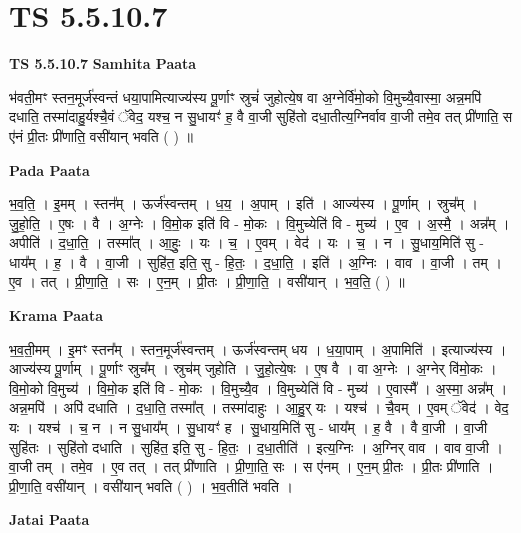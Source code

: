 \documentclass[17pt]{extarticle}
\begin{document}
\section{ TS 5.5.10.7 }

\textbf{TS 5.5.10.7 } \newline
\textbf{Samhita Paata} \newline

भ॑वती॒मꣳ स्तन॒मूर्ज॑स्वन्तं धया॒पामित्याज्य॑स्य पू॒र्णाꣳ स्रुचं॑ जुहोत्ये॒ष वा अ॒ग्नेर्वि॑मो॒को वि॒मुच्यै॒वास्मा॒ अन्न॒मपि॑ दधाति॒ तस्मा॑दाहु॒र्यश्चै॒वं ॅवेद॒ यश्च॒ न सु॒धायꣳ॑ ह॒ वै वा॒जी सुहि॑तो दधा॒तीत्य॒ग्निर्वाव वा॒जी तमे॒व तत् प्री॑णाति॒ स ए॑नं प्री॒तः प्री॑णाति॒ वसी॑यान् भवति ( ) ॥ \newline

\textbf{Pada Paata} \newline

भ॒व॒ति॒ । इ॒मम् । स्तन᳚म् । ऊर्ज॑स्वन्तम् । ध॒य॒ । अ॒पाम् । इति॑ । आज्य॑स्य । पू॒र्णाम् । स्रुच᳚म् । जु॒हो॒ति॒ । ए॒षः । वै । अ॒ग्नेः । वि॒मो॒क इति॑ वि - मो॒कः । वि॒मुच्येति॑ वि - मुच्य॑ । ए॒व । अ॒स्मै॒ । अन्न᳚म् । अपीति॑ । द॒धा॒ति॒ । तस्मा᳚त् । आ॒हुः॒ । यः । च॒ । ए॒वम् । वेद॑ । यः । च॒ । न । सु॒धाय॒मिति॑ सु - धाय᳚म् । ह॒ । वै । वा॒जी । सुहि॑त॒ इति॒ सु - हि॒तः॒ । द॒धा॒ति॒ । इति॑ । अ॒ग्निः । वाव । वा॒जी । तम् । ए॒व । तत् । प्री॒णा॒ति॒ । सः । ए॒न॒म् । प्री॒तः । प्री॒णा॒ति॒ । वसी॑यान् । भ॒व॒ति॒ ( ) ॥  \newline


\textbf{Krama Paata} \newline

भ॒व॒ती॒मम् । इ॒मꣳ स्तन᳚म् । स्तन॒मूर्ज॑स्वन्तम् । ऊर्ज॑स्वन्तम् धय । ध॒या॒पाम् । अ॒पामिति॑ । इत्याज्य॑स्य । आज्य॑स्य पू॒र्णाम् । पू॒र्णाꣳ स्रुच᳚म् । स्रुच॑म् जुहोति । जु॒हो॒त्ये॒षः । ए॒ष वै । वा अ॒ग्नेः । अ॒ग्नेर् वि॑मो॒कः । वि॒मो॒को वि॒मुच्य॑ । वि॒मो॒क इति॑ वि - मो॒कः । वि॒मुच्यै॒व । वि॒मुच्येति॑ वि - मुच्य॑ । ए॒वास्मै᳚ । अ॒स्मा॒ अन्न᳚म् । अन्न॒मपि॑ । अपि॑ दधाति । द॒धा॒ति॒ तस्मा᳚त् । तस्मा॑दाहुः । आ॒हु॒र् यः । यश्च॑ । चै॒वम् । ए॒वम् ॅवेद॑ । वेद॒ यः । यश्च॑ । च॒ न । न सु॒धाय᳚म् । सु॒धायꣳ॑ ह । सु॒धाय॒मिति॑ सु - धाय᳚म् । ह॒ वै । वै वा॒जी । वा॒जी सुहि॑तः । सुहि॑तो दधाति । सुहि॑त॒ इति॒ सु - हि॒तः॒ । द॒धा॒तीति॑ । इत्य॒ग्निः । अ॒ग्निर् वाव । वाव वा॒जी । वा॒जी तम् । तमे॒व । ए॒व तत् । तत् प्री॑णाति । प्री॒णा॒ति॒ सः । स ए॑नम् । ए॒न॒म् प्री॒तः । प्री॒तः प्री॑णाति । प्री॒णा॒ति॒ वसी॑यान् । वसी॑यान् भवति ( ) । भ॒व॒तीति॑ भवति । \newline

\textbf{Jatai Paata} \newline
\end{document}
